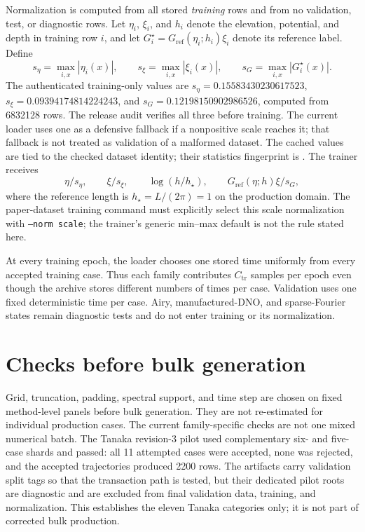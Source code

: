 \documentclass[10pt]{article}
\newcommand{\Gref}{G_{\mathrm{ref}}}
\begin{document}
Normalization is computed from all stored \emph{training} rows and from no
validation, test, or diagnostic rows.  Let $\eta_i$, $\xi_i$, and $h_i$
denote the elevation, potential, and depth in training row $i$, and let
$G_i^\star=\Gref(\eta_i;h_i)\xi_i$ denote its reference label.  Define
\[
  s_\eta=\max_{i,x}|\eta_i(x)|,\qquad
  s_\xi=\max_{i,x}|\xi_i(x)|,\qquad
  s_G=\max_{i,x}|G_i^\star(x)|.
\]
The authenticated training-only values are
\(s_\eta=0.15583430230617523\),
\(s_\xi=0.09394174814224243\), and
\(s_G=0.12198150902986526\), computed from 6832128 rows.  The release audit
verifies all three before training.  The current loader uses one as
a defensive fallback if a nonpositive scale reaches it; that fallback is not
treated as validation of a malformed dataset.  The cached values are tied to
the checked dataset identity; their statistics fingerprint is
.
The trainer receives
\[
  \eta/s_\eta,\qquad
  \xi/s_\xi,\qquad
  \log(h/h_\star),\qquad
  \Gref(\eta;h)\xi/s_G,
\]
where the reference length is $h_\star=L/(2\pi)=1$ on the production domain.
The paper-dataset training command must explicitly select this scale
normalization with \texttt{--norm scale}; the trainer's generic min--max
default is not the rule stated here.

At every training epoch, the loader chooses one stored time uniformly from
every accepted training case.  Thus each family contributes
$C_{\mathrm{tr}}$ samples per epoch even though the archive stores different
numbers of times per case.  Validation uses one fixed deterministic time per
case.  Airy,
manufactured-DNO, and sparse-Fourier states remain diagnostic tests and do
not enter training or its normalization.

\section{Checks before bulk generation}
\label{sec:release}

Grid, truncation, padding, spectral support, and time step are chosen on
fixed method-level panels before bulk generation.  They are not re-estimated
for individual production cases.  The current family-specific checks are not
one mixed numerical batch.  The Tanaka revision-3 pilot used complementary
six- and five-case shards and passed: all 11 attempted cases were accepted,
none was rejected, and the accepted trajectories produced 2200 rows.  The
artifacts carry validation split tags so that the transaction path is tested,
but their dedicated pilot roots are diagnostic and are excluded from final
validation data, training, and normalization.  This establishes the eleven
Tanaka categories only; it is not part of corrected bulk production.
\end{document}
